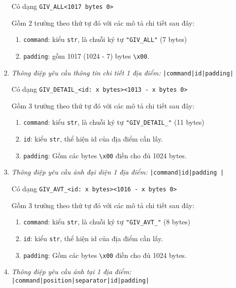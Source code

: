 \begin{enumerate}
\begin{enumerate}
Có dạng \texttt{GIV{\_}ALL<1017 bytes 0>}

Gồm 2 trường theo thứ tự đó với các mô tả chi tiết sau đây:

\begin{enumerate}
\item \texttt{command}: kiểu \texttt{str}, là chuỗi ký tự \texttt{"GIV{\_}ALL"} (7 bytes)
\item \texttt{padding}: gồm 1017 (1024 - 7) bytes \texttt{\textbackslash x00}.

\end{enumerate}

\item \textit{Thông điệp yêu cầu thông tin chi tiết 1 địa điểm:} \texttt{|command|id|padding|}

Có dạng \texttt{GIV{\_}DETAIL{\_}<id: x bytes><1013 - x bytes 0>} 

Gồm 3 trường theo thứ tự đó với các mô tả chi tiết sau đây:

\begin{enumerate}
\item \texttt{command}: kiểu \texttt{str}, là chuỗi ký tự \texttt{"GIV{\_}DETAIL{\_}"} (11 bytes)
\item \texttt{id}: kiểu \texttt{str}, thể hiện id của địa điểm cần lấy.
\item \texttt{padding}: Gồm các bytes \texttt{\textbackslash x00} điền cho đủ 1024 bytes.
\end{enumerate}

\item \textit{Thông điệp yêu cầu ảnh đại diện 1 địa điểm:} \texttt{|command|id|padding |}

Có dạng \texttt{GIV{\_}AVT{\_}<id: x bytes><1016 - x bytes 0>} 

Gồm 3 trường theo thứ tự đó với các mô tả chi tiết sau đây:

\begin{enumerate}
\item \texttt{command}: kiểu \texttt{str}, là chuỗi ký tự \texttt{"GIV{\_}AVT{\_}"} (8 bytes)
\item \texttt{id}: kiểu \texttt{str}, thể hiện id của địa điểm cần lấy.
\item \texttt{padding}: Gồm các bytes \texttt{\textbackslash x00} điền cho đủ 1024 bytes.
\end{enumerate}

\item \textit{Thông điệp yêu cầu ảnh tại 1 địa điểm:} \texttt{|command|position|separator|id|padding|}


\end{enumerate}
\end{enumerate}

